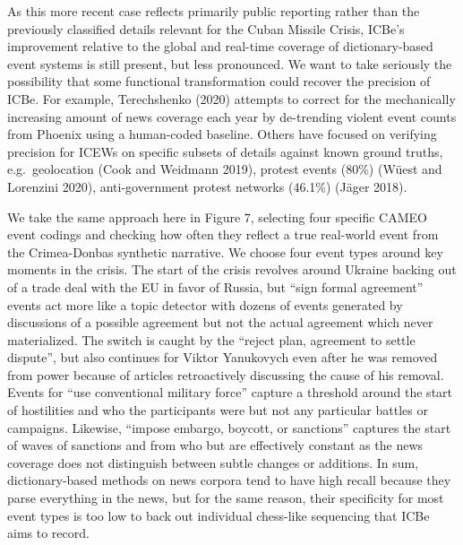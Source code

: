 \documentclass{article}
\begin{document}
As this more recent case reflects primarily public reporting rather than
the previously classified details relevant for the Cuban Missile Crisis,
ICBe's improvement relative to the global and real-time coverage of
dictionary-based event systems is still present, but less pronounced. We
want to take seriously the possibility that some functional
transformation could recover the precision of ICBe. For example,
Terechshenko (2020) attempts to correct for the mechanically increasing
amount of news coverage each year by de-trending violent event counts
from Phoenix using a human-coded baseline. Others have focused on
verifying precision for ICEWs on specific subsets of details against
known ground truths, e.g.~geolocation (Cook and Weidmann 2019), protest
events (80\%) (Wüest and Lorenzini 2020), anti-government protest
networks (46.1\%) (Jäger 2018).

We take the same approach here in Figure 7, selecting four specific
CAMEO event codings and checking how often they reflect a true
real-world event from the Crimea-Donbas synthetic narrative. We choose
four event types around key moments in the crisis. The start of the
crisis revolves around Ukraine backing out of a trade deal with the EU
in favor of Russia, but ``sign formal agreement'' events act more like a
topic detector with dozens of events generated by discussions of a
possible agreement but not the actual agreement which never
materialized. The switch is caught by the ``reject plan, agreement to
settle dispute'', but also continues for Viktor Yanukovych even after he
was removed from power because of articles retroactively discussing the
cause of his removal. Events for ``use conventional military force''
capture a threshold around the start of hostilities and who the
participants were but not any particular battles or campaigns. Likewise,
``impose embargo, boycott, or sanctions'' captures the start of waves of
sanctions and from who but are effectively constant as the news coverage
does not distinguish between subtle changes or additions. In sum,
dictionary-based methods on news corpora tend to have high recall
because they parse everything in the news, but for the same reason,
their specificity for most event types is too low to back out individual
chess-like sequencing that ICBe aims to record.
\end{document}
